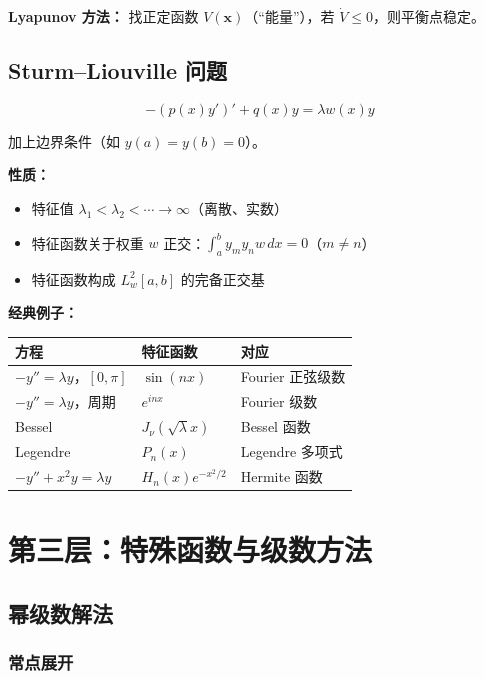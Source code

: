 \textbf{Lyapunov 方法：} 找正定函数 $V(\mathbf{x})$（“能量”），若 $\dot{V} \leq 0$，则平衡点稳定。

\subsection{Sturm--Liouville 问题}

\[
-(p(x)y')' + q(x)y = \lambda w(x)y
\]

加上边界条件（如 $y(a) = y(b) = 0$）。

\textbf{性质：}
\begin{itemize}
  \item 特征值 $\lambda_1 < \lambda_2 < \cdots \to \infty$（离散、实数）
  \item 特征函数关于权重 $w$ 正交：$\int_a^b y_m y_n w\,dx = 0$（$m \neq n$）
  \item 特征函数构成 $L^2_w[a,b]$ 的完备正交基
\end{itemize}

\textbf{经典例子：}

\begin{center}
\begin{tabular}{p{4cm}p{3cm}p{4cm}}
\toprule
\textbf{方程} & \textbf{特征函数} & \textbf{对应} \\
\midrule
$-y'' = \lambda y$，$[0,\pi]$ & $\sin(nx)$ & Fourier 正弦级数 \\
$-y'' = \lambda y$，周期 & $e^{inx}$ & Fourier 级数 \\
Bessel & $J_\nu(\sqrt{\lambda}x)$ & Bessel 函数 \\
Legendre & $P_n(x)$ & Legendre 多项式 \\
$-y'' + x^2 y = \lambda y$ & $H_n(x)e^{-x^2/2}$ & Hermite 函数 \\
\bottomrule
\end{tabular}
\end{center}

\section{第三层：特殊函数与级数方法}

\subsection{幂级数解法}

\subsubsection{常点展开}

